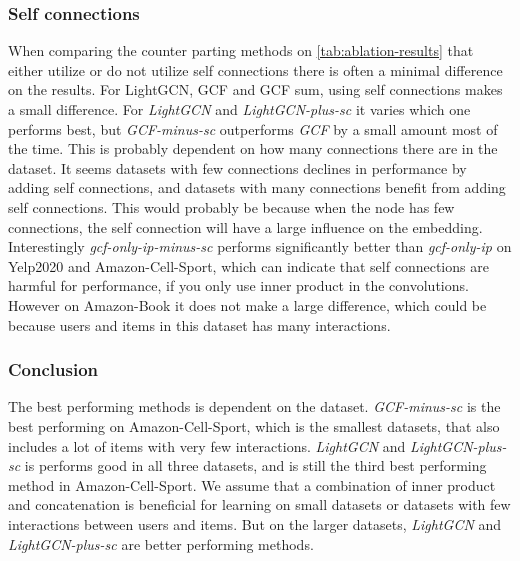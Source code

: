 \subsubsection{Self connections}
When comparing the counter parting methods on \autoref{tab:ablation-results} that either utilize or do not utilize self connections there is often a minimal difference on the results.
For LightGCN, GCF and GCF sum, using self connections makes a small difference.
For \textit{LightGCN} and \textit{LightGCN-plus-sc} it varies which one performs best, but \textit{GCF-minus-sc} outperforms \textit{GCF} by a small amount most of the time.
This is probably dependent on how many connections there are in the dataset.
It seems datasets with few connections declines in performance by adding self connections, and datasets with many connections benefit from adding self connections.
This would probably be because when the node has few connections, the self connection will have a large influence on the embedding.
Interestingly \textit{gcf-only-ip-minus-sc} performs significantly better than \textit{gcf-only-ip} on Yelp2020 and Amazon-Cell-Sport, which can indicate that self connections are harmful for performance, if you only use inner product in the convolutions.
However on Amazon-Book it does not make a large difference, which could be because users and items in this dataset has many interactions.

\subsubsection{Conclusion}
The best performing methods is dependent on the dataset.
\textit{GCF-minus-sc} is the best performing on Amazon-Cell-Sport, which is the smallest datasets, that also includes a lot of items with very few interactions.
\textit{LightGCN} and \textit{LightGCN-plus-sc} is performs good in all three datasets, and is still the third best performing method in Amazon-Cell-Sport.
We assume that a combination of inner product and concatenation is beneficial for learning on small datasets or datasets with few interactions between users and items.
But on the larger datasets, \textit{LightGCN} and \textit{LightGCN-plus-sc} are better performing methods.
